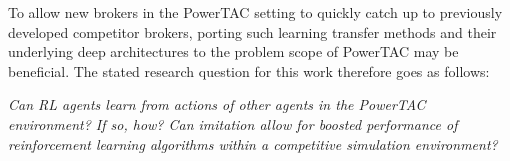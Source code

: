 To allow new brokers in the \ac {PowerTAC} setting to quickly catch up to previously developed competitor brokers,
porting such learning transfer methods and their underlying deep architectures to the problem scope of \ac {PowerTAC}
may be beneficial. The stated research question for this work therefore goes as follows:

\emph{Can \ac {RL} agents learn from actions of other agents in the \ac {PowerTAC} environment? If so, how? Can imitation allow for
boosted performance of reinforcement learning algorithms within a competitive simulation environment?} 






